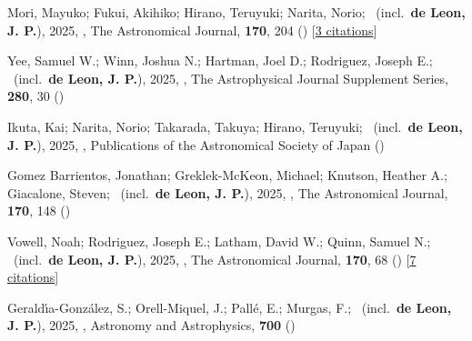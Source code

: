 \item[{\color{numcolor}\scriptsize86}] Mori, Mayuko; Fukui, Akihiko; Hirano, Teruyuki; Narita, Norio; \etal\ (incl.\ \textbf{de Leon, J. P.}), 2025, , The Astronomical Journal, \textbf{170}, 204 () [\href{https://ui.adsabs.harvard.edu/abs/2025AJ....170..204M}{3 citations}]

\item[{\color{numcolor}\scriptsize85}] Yee, Samuel W.; Winn, Joshua N.; Hartman, Joel D.; Rodriguez, Joseph E.; \etal\ (incl.\ \textbf{de Leon, J. P.}), 2025, , The Astrophysical Journal Supplement Series, \textbf{280}, 30 ()

\item[{\color{numcolor}\scriptsize84}] Ikuta, Kai; Narita, Norio; Takarada, Takuya; Hirano, Teruyuki; \etal\ (incl.\ \textbf{de Leon, J. P.}), 2025, , Publications of the Astronomical Society of Japan ()

\item[{\color{numcolor}\scriptsize83}] Gomez Barrientos, Jonathan; Greklek-McKeon, Michael; Knutson, Heather A.; Giacalone, Steven; \etal\ (incl.\ \textbf{de Leon, J. P.}), 2025, , The Astronomical Journal, \textbf{170}, 148 ()

\item[{\color{numcolor}\scriptsize82}] Vowell, Noah; Rodriguez, Joseph E.; Latham, David W.; Quinn, Samuel N.; \etal\ (incl.\ \textbf{de Leon, J. P.}), 2025, , The Astronomical Journal, \textbf{170}, 68 () [\href{https://ui.adsabs.harvard.edu/abs/2025AJ....170...68V}{7 citations}]

\item[{\color{numcolor}\scriptsize81}] Gerald{\'\i}a-Gonz{\'a}lez, S.; Orell-Miquel, J.; Pall{\'e}, E.; Murgas, F.; \etal\ (incl.\ \textbf{de Leon, J. P.}), 2025, , Astronomy and Astrophysics, \textbf{700} ()

